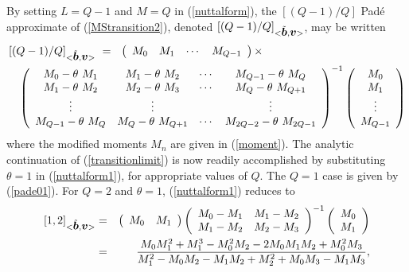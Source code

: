 By setting $L=Q-1$ and $M=Q$ in (\ref{nuttalform}),  the 
$\left[{(Q-1)/Q}\right]$ 
Pad\'{e} approximate  of
 (\ref{MStransition2}), denoted $\left[{(Q-1)/Q}\right]_{<\tilde{\mbox{\boldmath$\mit b$\unboldmath}},{\mbox{\boldmath$\mit v$\unboldmath}}>}$,  may be written
\begin{eqnarray} \label{nuttalform1}
\lefteqn{{\left[{(Q-1)/Q}\right]}_{<\tilde{\bmi  b},{\bmi  v}>}\ =
\ \ \left({\begin{array}{cccc}{M}_{0}&{M}_{1}&\cdots &{M}_{Q-1}\end{array}}
\right)\times} \nonumber\\
&&
{\left({\begin{array}{cccc}{M}_{0}-\theta \ 
{M}_{1}&{M}_{1}- \theta \ {M}_{2}&\cdots &{M}_{Q-1}- \theta 
 \ {M}_{Q}\\ {M}_{1}- \theta  \ {M}_{2}&{M}_{2}- 
\theta  \ {M}_{3}&\cdots &{M}_{Q}- \theta  \ {M}_{Q+1}\\ 
\vdots&\vdots&&\vdots\\ {M}_{Q-1}- \theta  \ {M}_{Q}&{M}_{Q}- 
\theta  \ {M}_{Q+1}&\cdots &{M}_{2 Q-2}- \theta  \ 
{M}_{2 Q-1}\end{array}}\right)}^{-1}\left({\begin{array}{c}{M}_{0}\\ 
{M}_{1}\\ \vdots\\ {M}_{Q-1}\end{array}}\right)
\end{eqnarray}
where the modified moments ${M}_{n}$ are given in (\ref{moment}). The 
analytic continuation of (\ref{transitionlimit}) is now readily 
accomplished by substituting
$\theta=1$ in (\ref{nuttalform1}), for appropriate values of $Q$. 
The $Q=1$ case is given by (\ref{pade01}). For  $Q=2$ and $\theta=1$,  
(\ref{nuttalform1}) reduces to
\begin{eqnarray} \label{pade12}
{[1,2]}_{<\tilde{\mbox{\boldmath$\mit b$\unboldmath}},{\mbox{\boldmath$\mit v$\unboldmath}}>} 
& = & \left({\begin{array}{cc}{M}_{0}&{M}_{1}\end{array}}\right)
{\left({\begin{array}{cc}{M}_{0}-{M}_{1}&{M}_{1}-{M}_{2}\\
{M}_{1}-{M}_{2}&{M}_{2}-{M}_{3}\end{array}}\right)}^{-1}
\left({\begin{array}{c}{M}_{0}\\ {M}_{1}\end{array}}\right) \nonumber\\
& = &\frac{M_0 M_{1}^2 +  M_{1}^3 
-  M_{0}^2 M_{2} - 2 M_{0} M_1 M_2 +  M_{0}^2 M_3}{ M_{1}^2 -  M_0 M_2 -  
M_1 M_2 +  M_{2}^2 + M_0 M_3 -  M_1 M_3},
\end{eqnarray}
